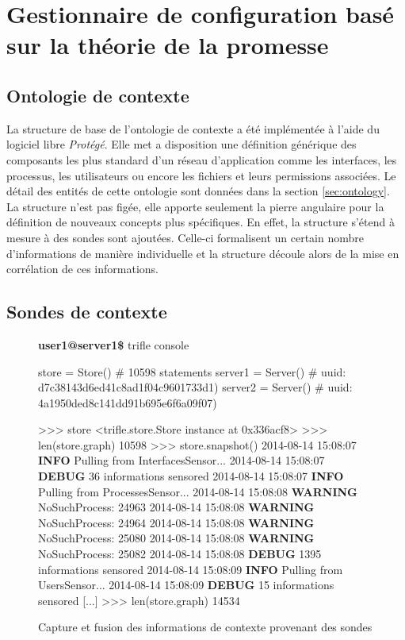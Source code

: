 \section{Gestionnaire de configuration basé sur la théorie de la promesse}

\subsection{Ontologie de contexte}

La structure de base de l'ontologie de contexte a été implémentée à l'aide du
logiciel libre \emph{Protégé}. Elle met a disposition une définition générique
des composants les plus standard d'un réseau d'application comme les interfaces,
les processus, les utilisateurs ou encore les fichiers et leurs permissions
associées. Le détail des entités de cette ontologie sont données dans la section
\ref{sec:ontology}. La structure n'est pas figée, elle apporte seulement la
pierre angulaire pour la définition de nouveaux concepts plus spécifiques. En
effet, la structure s'étend à mesure à des sondes sont ajoutées.  Celle-ci
formalisent un certain nombre d'informations de manière individuelle et la
structure découle alors de la mise en corrélation de ces informations.

\subsection{Sondes de contexte}

\begin{figure}[h]
    \scriptsize
    \begin{myverbatim}[commandchars=\\\{\},codes={\catcode`$=3\catcode`_=8}]
\textbf{user1@server1\$} trifle console

store   = Store()  # 10598 statements
server1 = Server() # uuid: d7c38143d6ed41c8ad1f04c9601733d1)
server2 = Server() # uuid: 4a1950ded8c141dd91b695e6f6a09f07)

>>> store
<trifle.store.Store instance at 0x336acf8>
>>> len(store.graph)
10598
>>> store.snapshot()
2014-08-14 15:08:07 \textbf{INFO} Pulling from InterfacesSensor...
2014-08-14 15:08:07 \textbf{DEBUG} 36 informations sensored
2014-08-14 15:08:07 \textbf{INFO} Pulling from ProcessesSensor...
2014-08-14 15:08:08 \textbf{WARNING} NoSuchProcess: 24963
2014-08-14 15:08:08 \textbf{WARNING} NoSuchProcess: 24964
2014-08-14 15:08:08 \textbf{WARNING} NoSuchProcess: 25080
2014-08-14 15:08:08 \textbf{WARNING} NoSuchProcess: 25082
2014-08-14 15:08:08 \textbf{DEBUG} 1395 informations sensored
2014-08-14 15:08:09 \textbf{INFO} Pulling from UsersSensor...
2014-08-14 15:08:09 \textbf{DEBUG} 15 informations sensored
[...]
>>> len(store.graph)
14534
    \end{myverbatim}
  \caption{Capture et fusion des informations de contexte provenant des sondes}
  \label{fig:sensor}
\end{figure}

